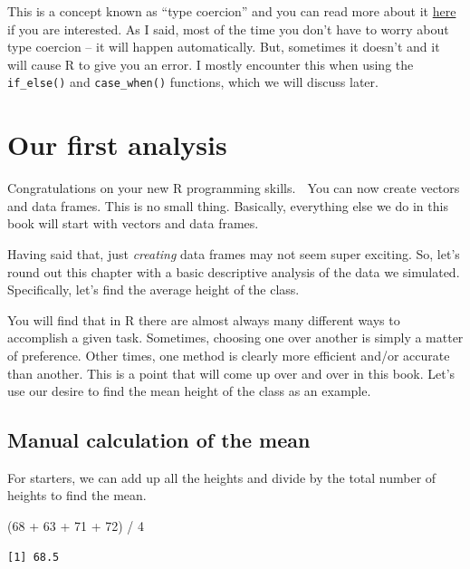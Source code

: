 \documentclass[
  letterpaper,
  DIV=11,
  numbers=noendperiod]{scrreprt}
\newenvironment{Shaded}{\begin{snugshade}}{\end{snugshade}}
\newcommand{\DecValTok}[1]{\textcolor[rgb]{0.68,0.00,0.00}{#1}}
\newcommand{\NormalTok}[1]{\textcolor[rgb]{0.00,0.23,0.31}{#1}}
\newcommand{\SpecialCharTok}[1]{\textcolor[rgb]{0.37,0.37,0.37}{#1}}
\begin{document}
This is a concept known as ``type coercion'' and you can read more about
it \href{https://r4ds.had.co.nz/vectors.html\#coercion}{here} if you are
interested. As I said, most of the time you don't have to worry about
type coercion -- it will happen automatically. But, sometimes it doesn't
and it will cause R to give you an error. I mostly encounter this when
using the \texttt{if\_else()} and \texttt{case\_when()} functions, which
we will discuss later.

\section{Our first analysis}\label{our-first-analysis}

Congratulations on your new R programming skills. 🎉 You can now create
vectors and data frames. This is no small thing. Basically, everything
else we do in this book will start with vectors and data frames.

Having said that, just \emph{creating} data frames may not seem super
exciting. So, let's round out this chapter with a basic descriptive
analysis of the data we simulated. Specifically, let's find the average
height of the class.

You will find that in R there are almost always many different ways to
accomplish a given task. Sometimes, choosing one over another is simply
a matter of preference. Other times, one method is clearly more
efficient and/or accurate than another. This is a point that will come
up over and over in this book. Let's use our desire to find the mean
height of the class as an example.

\subsection{Manual calculation of the
mean}\label{manual-calculation-of-the-mean}

For starters, we can add up all the heights and divide by the total
number of heights to find the mean.

\begin{Shaded}
\begin{Highlighting}[]
\NormalTok{(}\DecValTok{68} \SpecialCharTok{+} \DecValTok{63} \SpecialCharTok{+} \DecValTok{71} \SpecialCharTok{+} \DecValTok{72}\NormalTok{) }\SpecialCharTok{/} \DecValTok{4}
\end{Highlighting}
\end{Shaded}

\begin{verbatim}
[1] 68.5
\end{verbatim}
\end{document}
